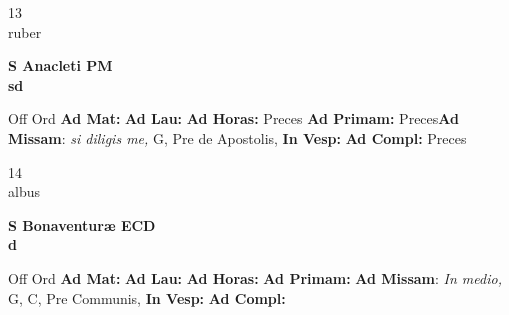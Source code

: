 \documentclass[10pt, openany]{book}
\begin{document}
    \begin{center}
        \begin{minipage}{3.5in}
            \vspace{2em}
            \begin{minipage}{0.5in}
                {\Huge 13} \\
                {\normalsize ruber}
            \end{minipage}
            \begin{minipage}{3.0in}
                \textbf{ \large S Anacleti PM \\
                \textnormal{\normalsize sd}}

            \end{minipage}
            \begin{justify}Off Ord
                \textbf{Ad Mat: }
                \textbf{Ad Lau: }
                \textbf{Ad Horas: }Preces
                \textbf{Ad Primam: }Preces\textbf{Ad Missam}: \textit{si diligis me,} G, Pre de Apostolis, 
                \textbf{In Vesp: }
                \textbf{Ad Compl: }Preces
            \end{justify}
        \end{minipage}
    \end{center}

    \begin{center}
        \begin{minipage}{3.5in}
            \vspace{2em}
            \begin{minipage}{0.5in}
                {\Huge 14} \\
                {\normalsize albus}
            \end{minipage}
            \begin{minipage}{3.0in}
                \textbf{ \large S Bonaventuræ ECD \\
                \textnormal{\normalsize d}}

            \end{minipage}
            \begin{justify}Off Ord
                \textbf{Ad Mat: }
                \textbf{Ad Lau: }
                \textbf{Ad Horas: }
                \textbf{Ad Primam: }\textbf{Ad Missam}: \textit{In medio,} G, C, Pre Communis, 
                \textbf{In Vesp: }
                \textbf{Ad Compl: }
            \end{justify}
        \end{minipage}
    \end{center}
\end{document}
